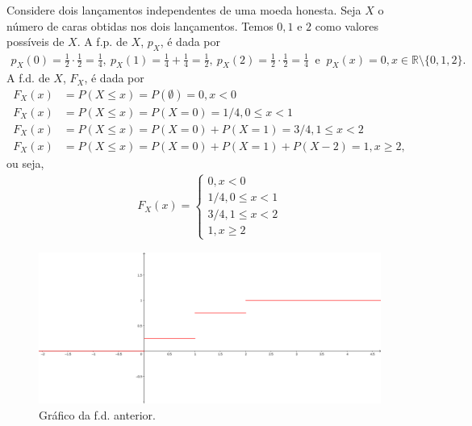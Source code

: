 \documentclass[../Notas.tex]{subfiles}
\begin{document}
\begin{example}
Considere dois lançamentos independentes de uma moeda honesta. Seja $X$ o número de caras obtidas nos dois lançamentos. Temos $0, 1$ e $2$ como valores possíveis de $X$. A f.p. de $X$, $p_X$, é dada por
\begin{align*}
    p_X(0) = \frac{1}{2}\cdot\frac{1}{2} = \frac{1}{4}, \ p_X(1) = \frac{1}{4} + \frac{1}{4} = \frac{1}{2}, \ p_X(2) = \frac{1}{2}\cdot\frac{1}{2} = \frac{1}{4} \ \text{ e } \ p_X(x) = 0, x\in\mathbb{R}\setminus\{0, 1, 2\}.
\end{align*}
A f.d. de $X$, $F_X$, é dada por
\begin{align*}
    F_X(x) &= P(X\leq x) = P(\emptyset) = 0, x < 0 \\
    F_X(x) &= P(X\leq x) = P(X=0) = 1/4, 0\leq x < 1 \\
    F_X(x) &= P(X\leq x) = P(X=0) + P(X=1) = 3/4, 1\leq x < 2 \\
    F_X(x) &= P(X\leq x) = P(X=0) + P(X=1) + P(X-2) = 1, x\geq 2,
\end{align*}
ou seja, 
\begin{align*}
    F_X(x) = \begin{cases}
    0, x<0 \\
    1/4, 0\leq x < 1 \\
    3/4, 1\leq x < 2 \\
    1, x\geq 2
    \end{cases}
\end{align*}
\begin{figure}[H]
    \centering
    \includegraphics[width=\textwidth]{Imagens/fd1.png}
    \caption{Gráfico da f.d. anterior.}
\end{figure}
\end{example}
\end{document}
